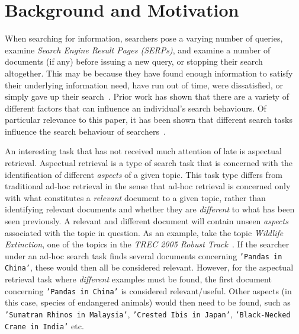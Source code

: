 \section{Background and Motivation}\label{sec:background}
When searching for information, searchers pose a varying number of queries, examine \emph{Search Engine Result Pages (SERPs)}, and examine a number of documents (if any) before issuing a new query, or stopping their search altogether. This may be because they have found enough information to satisfy their underlying information need, have run out of time, were dissatisfied, or simply gave up their search~\cite{diriye2012abandonment,dostert2009stopping_behaviours,hassan2013beyond_clicks,kiseleva2015serp_fails,prabha2007enough,zach2005stopping_behaviours}. Prior work has shown that there are a variety of different factors that can influence an individual's search behaviours. Of particular relevance to this paper, it has been shown that different search tasks influence the search behaviour of searchers~\cite{kelly2015search_tasks}.

An interesting task that has not received much attention of late is aspectual retrieval. Aspectual retrieval is a type of search task that is concerned with the identification of different \emph{aspects} of a given topic. This task type differs from traditional ad-hoc retrieval in the sense that ad-hoc retrieval is concerned only with what constitutes a \emph{relevant} document to a given topic, rather than identifying relevant documents and whether they are \emph{different} to what has been seen previously. A relevant and different document will contain unseen \emph{aspects} associated with the topic in question. As an example, take the topic \emph{Wildlife Extinction}, one of the topics in the \emph{TREC 2005 Robust Track}~\cite{voorhees2006trec_robust}. If the searcher under an ad-hoc search task finds several documents concerning \texttt{'Pandas in China'}, these would then all be considered relevant. However, for the aspectual retrieval task where \emph{different} examples must be found, the first document concerning \texttt{'Pandas in China'} is considered relevant/useful. Other aspects (in this case, species of endangered animals) would then need to be found, such as \texttt{'Sumatran Rhinos in Malaysia'}, \texttt{'Crested Ibis in Japan'}, \texttt{'Black-Necked Crane in India'} etc.

